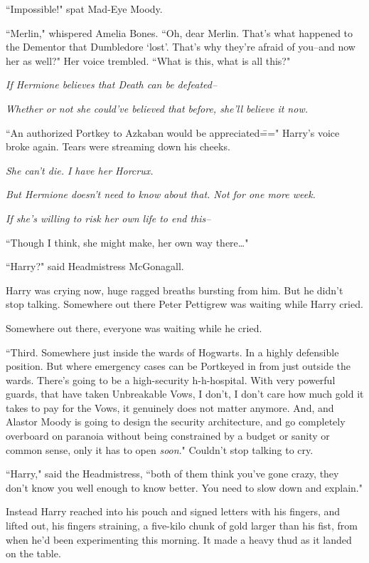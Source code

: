 ``Impossible!" spat Mad-Eye Moody.

``Merlin," whispered Amelia Bones. ``Oh, dear Merlin. That's what happened to the Dementor that Dumbledore `lost'. That's why they're afraid of you\---and now her as well?" Her voice trembled. ``What is this, what is all this?"

\emph{If Hermione believes that Death can be defeated\---}

\emph{Whether or not she could've believed that before, she'll believe it now.}

``An authorized Portkey to Azkaban would be appreciated\===" Harry's voice broke again. Tears were streaming down his cheeks.

\emph{She can't die. I have her Horcrux.}

\emph{But Hermione doesn't need to know about that. Not for one more week.}

\emph{If she's willing to risk her own life to end this\---}

``Though I think, she might make, her own way there{\ldots}"

``Harry?" said Headmistress McGonagall.

Harry was crying now, huge ragged breaths bursting from him. But he didn't stop talking. Somewhere out there Peter Pettigrew was waiting while Harry cried.

Somewhere out there, everyone was waiting while he cried.

``Third. Somewhere just inside the wards of Hogwarts. In a highly defensible position. But where emergency cases can be Portkeyed in from just outside the wards. There's going to be a high-security h-h-hospital. With very powerful guards, that have taken Unbreakable Vows, I don't, I don't care how much gold it takes to pay for the Vows, it genuinely does not matter anymore. And, and Alastor Moody is going to design the security architecture, and go completely overboard on paranoia without being constrained by a budget or sanity or common sense, only it has to open \emph{soon}." Couldn't stop talking to cry.

``Harry," said the Headmistress, ``both of them think you've gone crazy, they don't know you well enough to know better. You need to slow down and explain."

Instead Harry reached into his pouch and signed letters with his fingers, and lifted out, his fingers straining, a five-kilo chunk of gold larger than his fist, from when he'd been experimenting this morning. It made a heavy thud as it landed on the table.


